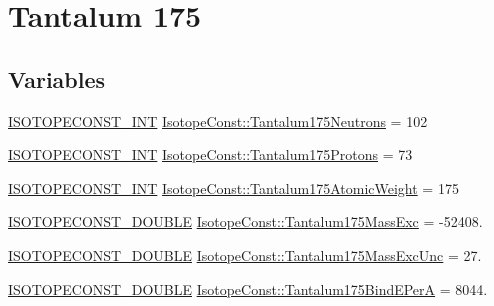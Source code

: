 \hypertarget{group___isotope_const-_tantalum-_ta175}{}\section{Tantalum 175}
\label{group___isotope_const-_tantalum-_ta175}
\subsection*{Variables}
\begin{DoxyCompactItemize}
\item 
\mbox{\hyperlink{group___isotope_const-_macros_ga5f18360b3e99483a35c32d789e62621c}{I\+S\+O\+T\+O\+P\+E\+C\+O\+N\+S\+T\+\_\+\+I\+NT}} \mbox{\hyperlink{group___isotope_const-_tantalum-_ta175_ga8a09813114c4d6b791abe90060b09546}{Isotope\+Const\+::\+Tantalum175\+Neutrons}} = 102
\item 
\mbox{\hyperlink{group___isotope_const-_macros_ga5f18360b3e99483a35c32d789e62621c}{I\+S\+O\+T\+O\+P\+E\+C\+O\+N\+S\+T\+\_\+\+I\+NT}} \mbox{\hyperlink{group___isotope_const-_tantalum-_ta175_gaaf6d5ee92cd282df447926637b1c0279}{Isotope\+Const\+::\+Tantalum175\+Protons}} = 73
\item 
\mbox{\hyperlink{group___isotope_const-_macros_ga5f18360b3e99483a35c32d789e62621c}{I\+S\+O\+T\+O\+P\+E\+C\+O\+N\+S\+T\+\_\+\+I\+NT}} \mbox{\hyperlink{group___isotope_const-_tantalum-_ta175_ga51aef6612ccdb4948de19bd0b11a305d}{Isotope\+Const\+::\+Tantalum175\+Atomic\+Weight}} = 175
\item 
\mbox{\hyperlink{group___isotope_const-_macros_ga8f45a7272ce02c0b4c65c44636ed719a}{I\+S\+O\+T\+O\+P\+E\+C\+O\+N\+S\+T\+\_\+\+D\+O\+U\+B\+LE}} \mbox{\hyperlink{group___isotope_const-_tantalum-_ta175_ga6d1b96cddcf33c5eee8543a053eccede}{Isotope\+Const\+::\+Tantalum175\+Mass\+Exc}} = -\/52408.
\item 
\mbox{\hyperlink{group___isotope_const-_macros_ga8f45a7272ce02c0b4c65c44636ed719a}{I\+S\+O\+T\+O\+P\+E\+C\+O\+N\+S\+T\+\_\+\+D\+O\+U\+B\+LE}} \mbox{\hyperlink{group___isotope_const-_tantalum-_ta175_ga70c4abb5ed1f4eb75d2bda5771281343}{Isotope\+Const\+::\+Tantalum175\+Mass\+Exc\+Unc}} = 27.
\item 
\mbox{\hyperlink{group___isotope_const-_macros_ga8f45a7272ce02c0b4c65c44636ed719a}{I\+S\+O\+T\+O\+P\+E\+C\+O\+N\+S\+T\+\_\+\+D\+O\+U\+B\+LE}} \mbox{\hyperlink{group___isotope_const-_tantalum-_ta175_ga8eb92b290c238be8549d0d4c320a1f29}{Isotope\+Const\+::\+Tantalum175\+Bind\+E\+PerA}} = 8044.
\item 

\end{DoxyCompactItemize}
